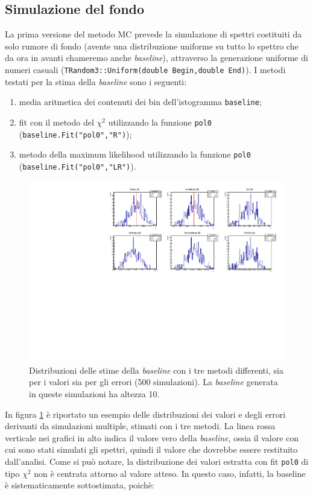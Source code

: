 \documentclass[10pt, oneside, a4paper]{article}   	%
\begin{document}
\subsection{Simulazione del fondo}
La prima versione del metodo MC prevede la simulazione di spettri costituiti da solo rumore di fondo (avente una distribuzione uniforme su tutto lo spettro che da ora in avanti chameremo anche \textit{baseline}), attraverso la generazione uniforme di numeri casuali (\lstinline{TRandom3::Uniform(double Begin,double End)}). 
I metodi testati per la stima della \textit{baseline} sono i seguenti:
\begin{enumerate}
 \item media aritmetica dei contenuti dei bin dell'istogramma \lstinline{baseline};
 \item fit con il metodo del $\chi^2$ utilizzando la funzione \lstinline{pol0} (\lstinline{baseline.Fit("pol0","R")});
 \item metodo della maximum likelihood utilizzando la funzione \newline \lstinline{pol0} (\lstinline{baseline.Fit("pol0","LR")}).
\end{enumerate}
%
\begin{figure}[H]
 \centerline{\includegraphics[scale=0.75]{img/baseline_sim_500.pdf}}
 \caption{Distribuzioni delle stime della \textit{baseline} con i tre metodi differenti, sia per i valori sia per gli errori (500 simulazioni). La \textit{baseline} generata in queste simulazioni ha altezza 10.}
 \label{fig::baseline_500}
\end{figure}
%
In figura \ref{fig::baseline_500} è riportato un esempio delle distribuzioni dei valori e degli errori derivanti da simulazioni multiple, stimati con i tre metodi. La linea rossa verticale nei grafici in alto indica il valore vero della \textit{baseline}, ossia il valore con cui sono stati simulati gli spettri, quindi il valore che dovrebbe essere restituito dall'analisi. Come si può notare, la distribuzione dei valori estratta con fit \lstinline{pol0} di tipo $\chi^2$ non è centrata attorno al valore atteso. In questo caso, infatti, la baseline è sistematicamente sottostimata, poichè:
\end{document}
